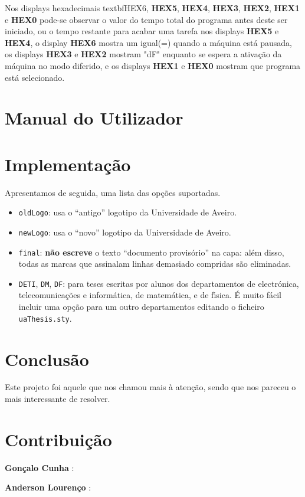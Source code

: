 \documentclass[11pt,twoside,a4paper]{report}
\begin{document}
 Nos displays hexadecimais textbf{HEX6}, \textbf{HEX5}, \textbf{HEX4}, \textbf{HEX3}, \textbf{HEX2}, \textbf{HEX1} e \textbf{HEX0} pode-se observar o valor do tempo total do programa antes deste ser iniciado, ou o tempo restante para acabar uma tarefa nos displays \textbf{HEX5} e \textbf{HEX4}, o display \textbf{HEX6} mostra um igual(=) quando a máquina está pausada, os displays \textbf{HEX3} e \textbf{HEX2} mostram "dF" enquanto se espera a ativação da máquina no modo diferido, e os displays \textbf{HEX1} e \textbf{HEX0} mostram que programa está selecionado.
 
 
\chapter{Manual do Utilizador}

\chapter{Implementação}

Apresentamos de seguida, uma lista das opções suportadas.
\begin{itemize}
  \item \verb+oldLogo+: usa o ``antigo'' logotipo da Universidade de Aveiro.
  \item \verb+newLogo+: usa o ``novo'' logotipo da Universidade de Aveiro.
  \item \verb+final+: \textbf{n\~ao escreve} o texto ``documento provis\'orio'' na capa: al\'em
        disso, todas as marcas que assinalam linhas demasiado compridas s\~ao eliminadas.
  \item \verb+DETI+, \verb+DM+, \verb+DF+: para teses escritas por alunos dos departamentos de
        electr\'onica, telecomunica\c c\~oes e inform\'atica, de matem\'atica, e de f\'\i sica.
        \'E muito f\'acil incluir uma op\c c\~ao para um outro departamentos editando o
        ficheiro \verb+uaThesis.sty+.
\end{itemize}

\chapter{Conclusão}

Este projeto foi aquele que nos chamou mais à atenção, sendo que nos pareceu o mais interessante de resolver.

\chapter{Contribuição}

\textbf{\Large Gonçalo Cunha} :

\textbf{\Large Anderson Lourenço} :
\end{document}
